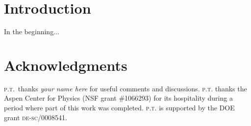 \documentclass[12pt]{article}
\begin{document}

\section{Introduction}

In the beginning... \lipsum[5]





 



 \section*{Acknowledgments}


\textsc{p.t.}\ thanks 
\emph{your name here}
for useful comments and discussions. 
%
\textsc{p.t.} thanks the Aspen Center for Physics (NSF grant \#1066293) for its hospitality during a period where part of this work was completed. \textsc{p.t.} is supported by the DOE grant \textsc{de-sc}/0008541.



% 
\end{document}
